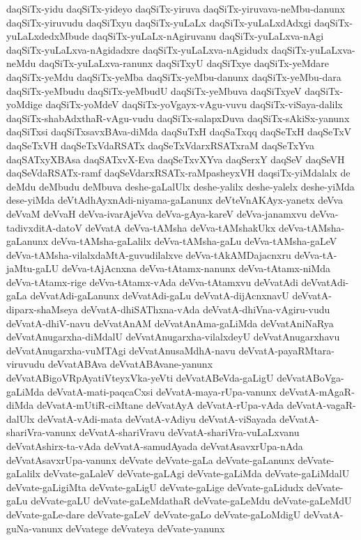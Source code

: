 {daqSiTx-yidu
daqSiTx-yideyo
daqSiTx-yiruva
daqSiTx-yiruvava-neMbu-danunx
daqSiTx-yiruvudu
daqSiTxyu
daqSiTx-yuLaLx
daqSiTx-yuLaLxdAdxgi
daqSiTx-yuLaLxdedxMbude
daqSiTx-yuLaLx-nAgiruvanu
daqSiTx-yuLaLxva-nAgi
daqSiTx-yuLaLxva-nAgidadxre
daqSiTx-yuLaLxva-nAgidudx
daqSiTx-yuLaLxva-neMdu
daqSiTx-yuLaLxva-ranunx
daqSiTxyU
daqSiTxye
daqSiTx-yeMdare
daqSiTx-yeMdu
daqSiTx-yeMba
daqSiTx-yeMbu-danunx
daqSiTx-yeMbu-dara
daqSiTx-yeMbudu
daqSiTx-yeMbudU
daqSiTx-yeMbuva
daqSiTxyeV
daqSiTx-yoMdige
daqSiTx-yoMdeV
daqSiTx-yoVgayx-vAgu-vuvu
daqSiTx-viSaya-dalilx
daqSiTx-shabAdxthaR-vAgu-vudu
daqSiTx-salapxDuva
daqSiTx-sAkiSx-yanunx
daqSiTxsi
daqSiTxsavxBAva-diMda
daqSuTxH
daqSaTxqq
daqSeTxH
daqSeTxV
daqSeTxVH
daqSeTxVdaRSATx
daqSeTxVdarxRSATxraM
daqSeTxYva
daqSATxyXBAsa
daqSATxvX-Eva
daqSeTxvXYva
daqSerxY
daqSeV
daqSeVH
daqSeVdaRSATx-ramf
daqSeVdarxRSATx-raMpasheyxVH
daqsiTx-yiMdalalx
de
deMdu
deMbudu
deMbuva
deshe-gaLalUlx
deshe-yalilx
deshe-yalelx
deshe-yiMda
dese-yiMda
deVtAdhAyxnAdi-niyama-gaLanunx
deVteVnAKAyx-yanetx
deVva
deVvaM
deVvaH
deVva-ivarAjeVva
deVva-gAya-kareV
deVva-janamxvu
deVva-tadivxditA-datoV
deVvatA
deVva-tAMsha
deVva-tAMshakUkx
deVva-tAMsha-gaLanunx
deVva-tAMsha-gaLalilx
deVva-tAMsha-gaLu
deVva-tAMsha-gaLeV
deVva-tAMsha-vilalxdaMtA-guvudilalxve
deVva-tAkAMDajacnxru
deVva-tA-jaMtu-gaLU
deVva-tAjAcnxna
deVva-tAtamx-nanunx
deVva-tAtamx-niMda
deVva-tAtamx-rige
deVva-tAtamx-vAda
deVva-tAtamxvu
deVvatAdi
deVvatAdi-gaLa
deVvatAdi-gaLanunx
deVvatAdi-gaLu
deVvatA-dijAcnxnavU
deVvatA-diparx-shaMseya
deVvatA-dhiSAThxna-vAda
deVvatA-dhiVna-vAgiru-vudu
deVvatA-dhiV-navu
deVvatAnAM
deVvatAnAma-gaLiMda
deVvatAniNaRya
deVvatAnugarxha-diMdalU
deVvatAnugarxha-vilalxdeyU
deVvatAnugarxhavu
deVvatAnugarxha-vuMTAgi
deVvatAnusaMdhA-navu
deVvatA-payaRMtara-viruvudu
deVvatABAva
deVvatABAvane-yanunx
deVvatABigoVRpAyatiVteyxVka-yeVti
deVvatABeVda-gaLigU
deVvatABoVga-gaLiMda
deVvatA-mati-paqcaCxsi
deVvatA-maya-rUpa-vanunx
deVvatA-mAgaR-diMda
deVvatA-mUtiR-ciMtane
deVvatAyA
deVvatA-rUpa-vAda
deVvatA-vagaR-dalUlx
deVvatA-vAdi-mata
deVvatA-vAdiyu
deVvatA-viSayada
deVvatA-shariVra-vanunx
deVvatA-shariVravu
deVvatA-shariVra-vuLaLxvanu
deVvatAshirx-ta-vAda
deVvatA-samudAyada
deVvatAsavxrUpa-nAda
deVvatAsavxrUpa-vanunx
deVvate
deVvate-gaLa
deVvate-gaLanunx
deVvate-gaLalilx
deVvate-gaLaleV
deVvate-gaLAgi
deVvate-gaLiMda
deVvate-gaLiMdalU
deVvate-gaLigiMta
deVvate-gaLigU
deVvate-gaLige
deVvate-gaLidudx
deVvate-gaLu
deVvate-gaLU
deVvate-gaLeMdathaR
deVvate-gaLeMdu
deVvate-gaLeMdU
deVvate-gaLe-dare
deVvate-gaLeV
deVvate-gaLo
deVvate-gaLoMdigU
deVvatA-guNa-vanunx
deVvatege
deVvateya
deVvate-yanunx
}
